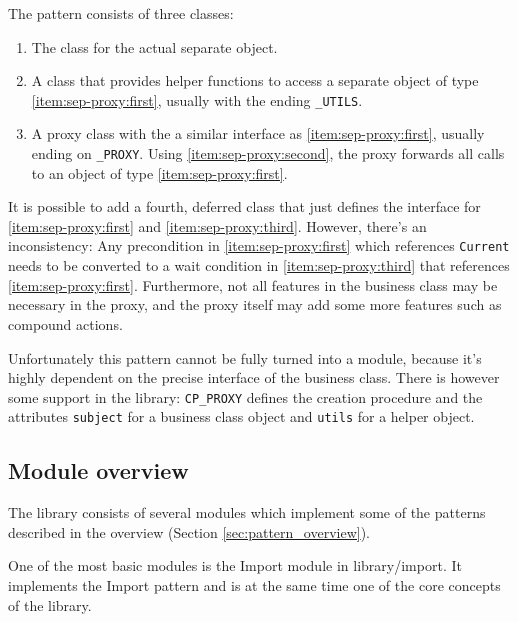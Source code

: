 \documentclass[a4paper,10pt]{article}
\newcommand{\dir} [1] [] {#1}
\newcommand{\todoref}{\todo{ref}}
\begin{document}
The pattern consists of three classes:
\begin{enumerate} [label=(\arabic*)]
 \item\label{item:sep-proxy:first} The class for the actual separate object.
 \item\label{item:sep-proxy:second} A class that provides helper functions to access a separate object of type \ref{item:sep-proxy:first}, usually with the ending \lstinline!_UTILS!.
 \item\label{item:sep-proxy:third} A proxy class with the a similar interface as \ref{item:sep-proxy:first}, usually ending on \lstinline!_PROXY!.
    Using \ref{item:sep-proxy:second}, the proxy forwards all calls to an object of type \ref{item:sep-proxy:first}.
\end{enumerate}


It is possible to add a fourth, deferred class that just defines the interface for \ref{item:sep-proxy:first} and \ref{item:sep-proxy:third}.
However, there's an inconsistency: 
Any precondition in \ref{item:sep-proxy:first} which references \lstinline!Current! needs to be converted to a wait condition in \ref{item:sep-proxy:third} that references \ref{item:sep-proxy:first}.
Furthermore, not all features in the business class may be necessary in the proxy, and the proxy itself may add some more features such as compound actions.

Unfortunately this pattern cannot be fully turned into a module, because it's highly dependent on the precise interface of the business class.
There is however some support in the library: 
\lstinline!CP_PROXY! defines the creation procedure and the attributes \lstinline!subject! for a business class object and \lstinline!utils! for a helper object.


\subsection {Module overview}
\label{sec:module-overview}

The library consists of several modules which implement some of the patterns described in the overview (Section \ref{sec:pattern_overview}).

One of the most basic modules is the Import module in \dir{library/import}.
It implements the Import pattern \todoref and is at the same time one of the core concepts of the library.
\end{document}
